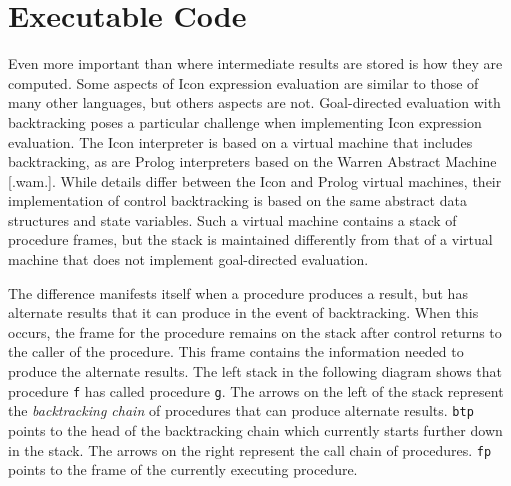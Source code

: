 \section{Executable Code}

Even more important than where intermediate results are stored is how
they are computed. Some aspects of Icon expression evaluation are
similar to those of many other languages, but others aspects are
not. Goal-directed evaluation with backtracking poses a particular
challenge when implementing Icon expression evaluation. The Icon
interpreter is based on a virtual machine that includes backtracking,
as are Prolog interpreters based on the Warren Abstract Machine
[.wam.]. While details differ between the Icon and Prolog virtual
machines, their implementation of control backtracking is based on the
same abstract data structures and state variables. Such a virtual
machine contains a stack of procedure frames, but the stack is
maintained differently from that of a virtual machine that does not
implement goal-directed evaluation.

The difference manifests itself when a procedure produces a result,
but has alternate results that it can produce in the event of
backtracking. When this occurs, the frame for the procedure remains on
the stack after control returns to the caller of the procedure. This
frame contains the information needed to produce the alternate
results. The left stack in the following diagram shows that procedure
\texttt{f} has called procedure \texttt{g}. The arrows on the left of
the stack represent the \textit{backtracking chain} of procedures that
can produce alternate results. \texttt{btp} points to the head of the
backtracking chain which currently starts further down in the
stack. The arrows on the right represent the call chain of procedures.
\texttt{fp} points to the frame of the currently executing procedure.

